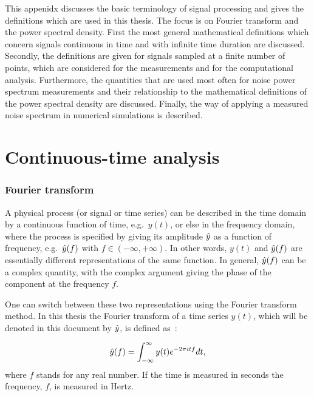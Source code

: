 
This appenidx discusses the basic terminology of signal processing and gives the definitions which are used in this thesis. The focus is on Fourier transform and the power spectral density. First the most general mathematical definitions which concern signals continuous in time and with infinite time duration are discussed. Secondly, the definitions are given for signals sampled at a finite number of points, which are considered for the measurements and for the computational analysis. Furthermore, the quantities that are used most often for noise power spectrum measurements and their relationship to the mathematical definitions of the power spectral density are discussed. Finally, the way of applying a measured noise spectrum in numerical simulations is described.

\section{Continuous-time analysis}\label{app:continuous_time_analysis}
\subsubsection*{Fourier transform} %
A physical process (or signal or time series) can be described in the time domain by a continuous function of time, e.g.~$y(t)$, or else in the frequency domain, where the process is specified by giving its amplitude $\hat{y}$ as a function of frequency, e.g.~$\hat{y}(f)$ with $f \in \left(-\infty, +\infty \right )$. In other words, $y(t)$ and $\hat{y}(f)$ are essentially different representations of the same function.  In general, $\hat{y}(f)$ can be a complex quantity, with the complex argument giving the phase of the component at the frequency $f$.

One can switch between these two representations using the Fourier transform method. In this thesis the Fourier transform of a time series $y(t)$, which will be denoted in this document by $\hat{y}$, is defined as~\cite{a_numerical_recipies}: %

\begin{equation}\label{eq:fft_definition}
\hat{y}(f) = \int_{-\infty}^{\infty} y(t) e^{-2\pi {i} t f} dt,
\end{equation}
where $f$ stands for any real number. 
If the time is measured in seconds the frequency, $f$, is measured in Hertz. 

